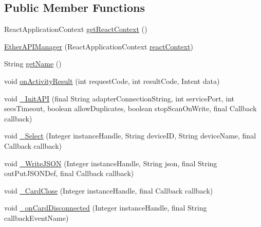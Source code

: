 \subsection*{Public Member Functions}
\begin{DoxyCompactItemize}
\item 
React\+Application\+Context \mbox{\hyperlink{classcom_1_1ethernom_1_1android_1_1etherapi_1_1_ether_a_p_i_manager_aa2d1aaff2f99ecea4715ab8742a30e9c}{get\+React\+Context}} ()
\item 
\mbox{\hyperlink{classcom_1_1ethernom_1_1android_1_1etherapi_1_1_ether_a_p_i_manager_a228a3c45f45682d7ea02dbef9713d641}{Ether\+A\+P\+I\+Manager}} (React\+Application\+Context \mbox{\hyperlink{classcom_1_1ethernom_1_1android_1_1etherapi_1_1_ether_a_p_i_manager_a6c6e5a9d5f4aa434d52a6b2ef9d80289}{react\+Context}})
\item 
String \mbox{\hyperlink{classcom_1_1ethernom_1_1android_1_1etherapi_1_1_ether_a_p_i_manager_afe5d0f60a99c060f1c729be6198d0fed}{get\+Name}} ()
\item 
void \mbox{\hyperlink{classcom_1_1ethernom_1_1android_1_1etherapi_1_1_ether_a_p_i_manager_ab97b475a2eb9bea1ca622f00cd7875c9}{on\+Activity\+Result}} (int request\+Code, int result\+Code, Intent data)
\item 
void \mbox{\hyperlink{classcom_1_1ethernom_1_1android_1_1etherapi_1_1_ether_a_p_i_manager_ab90db6291ae1fcb113484812b57355da}{\+\_\+\+Init\+A\+PI}} (final String adapter\+Connection\+String, int service\+Port, int secs\+Timeout, boolean allow\+Duplicates, boolean stop\+Scan\+On\+Write, final Callback callback)
\item 
void \mbox{\hyperlink{classcom_1_1ethernom_1_1android_1_1etherapi_1_1_ether_a_p_i_manager_af52a5c37a66de269e947018921f85b4f}{\+\_\+\+Select}} (Integer instance\+Handle, String device\+ID, String device\+Name, final Callback callback)
\item 
void \mbox{\hyperlink{classcom_1_1ethernom_1_1android_1_1etherapi_1_1_ether_a_p_i_manager_ac427fa54412d242b18a243a1e630ed0f}{\+\_\+\+Write\+J\+S\+ON}} (Integer instance\+Handle, String json, final String out\+Put\+J\+S\+O\+N\+Def, final Callback callback)
\item 
void \mbox{\hyperlink{classcom_1_1ethernom_1_1android_1_1etherapi_1_1_ether_a_p_i_manager_a362db698578b23502acc6e72caa7e4a6}{\+\_\+\+Card\+Close}} (Integer instance\+Handle, final Callback callback)
\item 
void \mbox{\hyperlink{classcom_1_1ethernom_1_1android_1_1etherapi_1_1_ether_a_p_i_manager_ac424b3028b3fc9537096f4af9587179b}{\+\_\+on\+Card\+Disconnected}} (Integer instance\+Handle, final String callback\+Event\+Name)

\end{DoxyCompactItemize}
